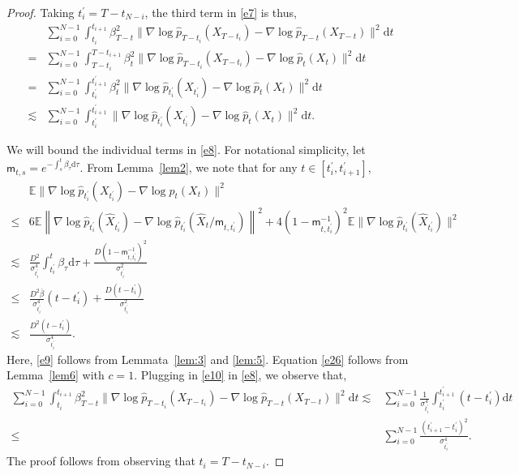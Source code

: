 \documentclass[12pts]{article}
\newcommand{\diff}{\mathrm{d}}
\newcommand{\hX}{ \widehat{X}}
\newcommand{\E}{\mathbb{E}}
\newcommand{\hp}{\hat{p}}
\begin{document}
 \begin{proof}
  Taking $t_i^\prime = T-t_{N-i}$, the third term in \eqref{e7} is thus,
 \begingroup
 \allowdisplaybreaks
\begin{align}
    & \sum_{i=0}^{N-1}\int_{t_i}^{t_{i+1}} \beta^2_{T-t} \|\nabla \log \hp_{T-t_i}(X_{T-t_i}) - \nabla \log \hp_{T-t}(X_{T-t})\|^2 \diff  t \nonumber\\
    = & \sum_{i=0}^{N-1}\int_{T-t_i}^{T-t_{i+1}} \beta^2_{t} \|\nabla \log \hp_{T-t_i}(X_{T-t_i}) - \nabla \log \hp_{t}(X_{t})\|^2 \diff  t \nonumber\\
    = & \sum_{i=0}^{N-1}\int_{t_i^\prime}^{t_{i+1}^\prime} \beta^2_{t} \|\nabla \log \hp_{t_i^\prime}(X_{t_i^\prime}) - \nabla \log \hp_{t}(X_{t})\|^2 \diff  t \nonumber\\
    \lesssim & \sum_{i=0}^{N-1}\int_{t_i^\prime}^{t_{i+1}^\prime} \|\nabla \log \hp_{t_i^\prime}(X_{t_i^\prime}) - \nabla \log \hp_{t}(X_{t})\|^2 \diff  t. \label{e8}
\end{align}
\endgroup

We will bound the individual terms in \eqref{e8}. For notational simplicity, let $\mathsf{m}_{t,s} = e^{-\int_s^t \beta_\tau \diff \tau}$. From Lemma~\ref{lem2}, we note that for any $t \in [t_i^\prime, t_{i+1}^\prime]$,
\begingroup
\allowdisplaybreaks
\begin{align}
    & \E \|\nabla \log \hp_{t_i^\prime}(X_{t_i^\prime}) - \nabla \log \hp_{t}(X_{t})\|^2 \nonumber\\
    \le & 6 \E \left\| \nabla \log \hp_{t_i^\prime}(\hX_{t_i^\prime}) - \nabla \log \hp_{t_i^\prime}(\hX_t/\mathsf{m}_{t,t_i^\prime})\right\|^2 + 4 (1-\mathsf{m}_{t,{t_i^\prime}}^{-1})^2 \E \|\nabla \log \hp_{t_i^\prime}(\hX_{t_i^\prime})\|^2 \nonumber\\
    \lesssim & \frac{D^2}{\sigma_{t_{i}^\prime}^4} \int_{{t_i^\prime}}^t \beta_\tau \diff  \tau + \frac{D(1-\mathsf{m}_{t,{t_i^\prime}}^{-1})^2}{\sigma_{t_i^\prime}^2} \label{e9}\\
    \le & \frac{D^2 \overline{\beta}}{\sigma_{t_{i}^\prime}^4} (t - {t_i^\prime}) + \frac{D (t - {t_i^\prime})}{\sigma_{t_i^\prime}^2} \label{e26}\\
    \lesssim & \frac{D^2 (t - {t_i^\prime})}{\sigma_{t_i^\prime}^4}. \label{e10}
\end{align}
\endgroup
Here, \eqref{e9} follows from Lemmata~\ref{lem:3} and \ref{lem:5}. Equation \eqref{e26} follows from  Lemma~\ref{lem6} with $c=1$. Plugging in \eqref{e10} in \eqref{e8}, we observe that,
\begin{align}
     \sum_{i=0}^{N-1}\int_{t_i}^{t_{i+1}} \beta^2_{T-t} \|\nabla \log \hp_{T-t_i}(X_{T-t_i}) - \nabla \log \hp_{T-t}(X_{T-t})\|^2 \diff  t 
    \lesssim & \sum_{i=0}^{N-1}\frac{1}{\sigma_{t_i^\prime}^4}\int_{t_i^\prime}^{t_{i+1}^\prime} (t - {t_i^\prime}) \diff  t  \nonumber\\
    \le & \sum_{i=0}^{N-1}\frac{(t_{i+1}^\prime - t_i^\prime)^2}{\sigma_{t_i^\prime}^4}. \label{e11}
\end{align}
The proof follows from observing that $t_i = T-t_{N-i}$.
\end{proof}
\end{document}
